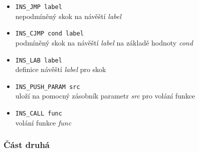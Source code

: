 \documentclass[a4paper, 12pt]{article}
\begin{document}
\begin{itemize}
	\item{\texttt{INS\_JMP label}} \\ 
	nepodmíněný skok na návěští \textit{label}
	
	\item{\texttt{INS\_CJMP cond label}} \\
	podmíněný skok na návěští \textit{label} na základě hodnoty \textit{cond}
	
	\item{\texttt{INS\_LAB label}} \\
	definice návěští \textit{label} pro skok
	
	\item{\texttt{INS\_PUSH\_PARAM src}} \\
	uloží na pomocný zásobník parametr \textit{src} pro volání funkce
	
	\item{\texttt{INS\_CALL func}} \\
	volání funkce \textit{func}
\end{itemize}

\newpage
\subsubsection{Část druhá}
\end{document}
